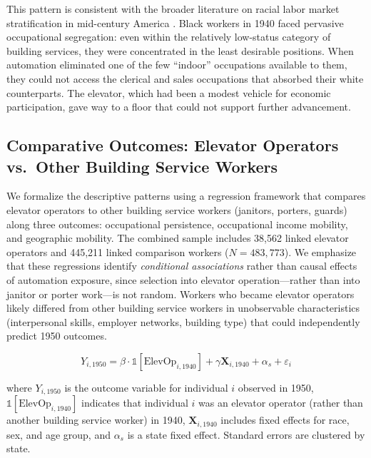 \documentclass[12pt]{article}
\begin{document}
This pattern is consistent with the broader literature on racial labor market stratification in mid-century America \citep{derenoncourt2022, collins2022}. Black workers in 1940 faced pervasive occupational segregation: even within the relatively low-status category of building services, they were concentrated in the least desirable positions. When automation eliminated one of the few ``indoor'' occupations available to them, they could not access the clerical and sales occupations that absorbed their white counterparts. The elevator, which had been a modest vehicle for economic participation, gave way to a floor that could not support further advancement.

\subsection{Comparative Outcomes: Elevator Operators vs.\ Other Building Service Workers}

We formalize the descriptive patterns using a regression framework that compares elevator operators to other building service workers (janitors, porters, guards) along three outcomes: occupational persistence, occupational income mobility, and geographic mobility. The combined sample includes 38,562 linked elevator operators and 445,211 linked comparison workers ($N = 483{,}773$). We emphasize that these regressions identify \emph{conditional associations} rather than causal effects of automation exposure, since selection into elevator operation---rather than into janitor or porter work---is not random. Workers who became elevator operators likely differed from other building service workers in unobservable characteristics (interpersonal skills, employer networks, building type) that could independently predict 1950 outcomes.

\begin{equation} \label{eq:displacement}
Y_{i,1950} = \beta \cdot \mathbb{1}[\text{ElevOp}_{i,1940}] + \gamma \mathbf{X}_{i,1940} + \alpha_s + \varepsilon_i
\end{equation}

where $Y_{i,1950}$ is the outcome variable for individual $i$ observed in 1950, $\mathbb{1}[\text{ElevOp}_{i,1940}]$ indicates that individual $i$ was an elevator operator (rather than another building service worker) in 1940, $\mathbf{X}_{i,1940}$ includes fixed effects for race, sex, and age group, and $\alpha_s$ is a state fixed effect. Standard errors are clustered by state.


\end{document}
